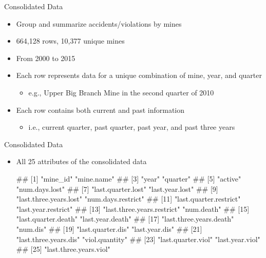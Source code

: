 \documentclass[]{beamer}
\providecommand{\tightlist}{%
  \setlength{\itemsep}{0pt}\setlength{\parskip}{0pt}}
\let\oldverbatim\verbatim
\let\endoldverbatim\endverbatim
\renewenvironment{verbatim}{\footnotesize\oldverbatim}{\endoldverbatim}
\begin{document}
\begin{frame}{Consolidated Data}

\begin{itemize}[<+->]
\tightlist
\item
  Group and summarize accidents/violations by mines
\item
  664,128 rows, 10,377 unique mines
\item
  From 2000 to 2015
\item
  Each row represents data for a unique combination of mine, year, and
  quarter

  \begin{itemize}[<+->]
  \tightlist
  \item
    e.g., Upper Big Branch Mine in the second quarter of 2010
  \end{itemize}
\item
  Each row contains both current and past information

  \begin{itemize}[<+->]
  \tightlist
  \item
    i.e., current quarter, past quarter, past year, and past three years
  \end{itemize}
\end{itemize}

\end{frame}

\begin{frame}[fragile]{Consolidated Data}

\begin{itemize}[<+->]
\tightlist
\item
  All 25 attributes of the consolidated data


\begin{verbatim}
##  [1] "mine_id"                   "mine.name"                
##  [3] "year"                      "quarter"                  
##  [5] "active"                    "num.days.lost"            
##  [7] "last.quarter.lost"         "last.year.lost"           
##  [9] "last.three.years.lost"     "num.days.restrict"        
## [11] "last.quarter.restrict"     "last.year.restrict"       
## [13] "last.three.years.restrict" "num.death"                
## [15] "last.quarter.death"        "last.year.death"          
## [17] "last.three.years.death"    "num.dis"                  
## [19] "last.quarter.dis"          "last.year.dis"            
## [21] "last.three.years.dis"      "viol.quantity"            
## [23] "last.quarter.viol"         "last.year.viol"           
## [25] "last.three.years.viol"
\end{verbatim}
\end{itemize}

\end{frame}
\end{document}
